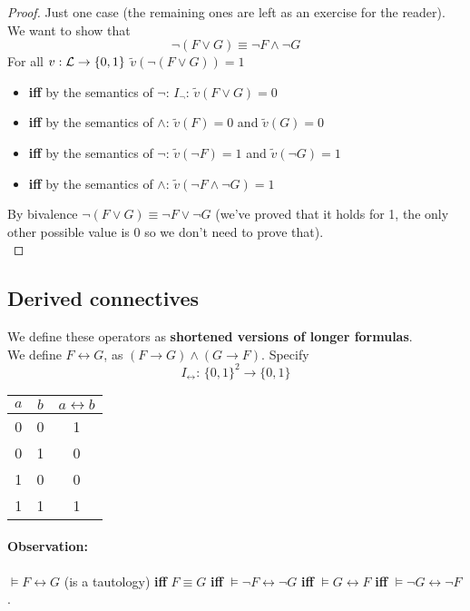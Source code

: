 \documentclass[11pt]{article}
\begin{document}
	\begin{proof}
		Just one case (the remaining ones are left as an exercise for the reader). We want to show that 
		$$ \neg (F \vee G) \equiv \neg F \wedge \neg G$$
		For all $v: \mathcal{L} \rightarrow \{0,1\}$ $\tilde{v} (\neg (F \vee G)) = 1$ 
		\begin{itemize}[label*=]
			\item \textbf{iff} by the semantics of $\neg$: $I_\neg$: $\tilde{v} (F \vee G) = 0$
			\item \textbf{iff} by the semantics of $\wedge$: $\tilde{v} (F) = 0$ and $\tilde{v}(G) = 0$
			\item \textbf{iff} by the semantics of $\neg$: $\tilde{v} (\neg F) = 1$ and $\tilde{v} (\neg G) = 1$
			\item \textbf{iff} by the semantics of $\wedge$: $\tilde{v} (\neg F \wedge \neg G) = 1$
		\end{itemize}
		
		By bivalence $\neg (F \vee G) \equiv \neg F \vee \neg G$ (we've proved that it holds for 1, the only other possible value is 0 so we don't need to prove that).\\
	\end{proof}
	
	\newpage
	
	\subsection{Derived connectives}
	We define these operators as \textbf{shortened versions of longer formulas}.\\
	
	We define $F \leftrightarrow G$, as $(F \rightarrow G) \wedge (G \rightarrow F)$. Specify
	$$ I_\leftrightarrow: \, \{0,1\}^2 \rightarrow \{0,1\} $$
	\begin{center}
		\begin{tabular}{c c | c}
			$a$ & $b$ & $a \leftrightarrow b$ \\
			\hline 
			0 & 0 & 1 \\
			0 & 1 & 0\\
			1 & 0 & 0\\
			1 & 1 & 1
		\end{tabular}
	\end{center}
	
	\paragraph{Observation:} $\models F \leftrightarrow G$ (is a tautology) \textbf{iff} $F \equiv G$ \textbf{iff} $\models \neg F \leftrightarrow \neg G$ \textbf{iff} $\models G \leftrightarrow F$ \textbf{iff} $\models \neg G \leftrightarrow \neg F$.\\
	
\end{document}

